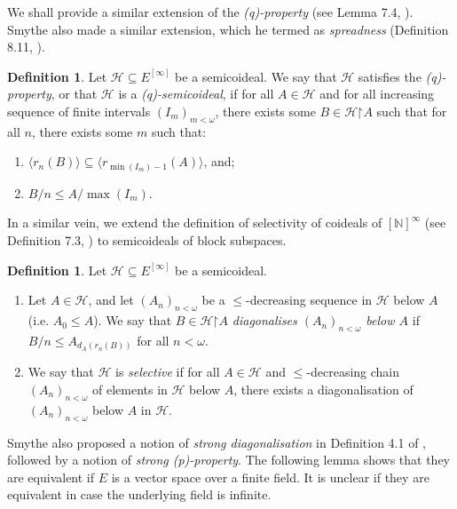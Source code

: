 \documentclass[11pt,reqno]{amsart}
\theoremstyle{plain}
\numberwithin{equation}{section}
\theoremstyle{definition}
\newtheorem{definition}[theorem]{Definition}
\renewcommand{\c}[1]{\langle #1 \rangle}
\newcommand{\N}{\mathbb{N}}
\newcommand{\cal}{\mathcal}
\newcommand{\restrictedto}{\mathord{\upharpoonright}}
\renewcommand{\H}{\cal{H}}
\begin{document}
We shall provide a similar extension of the \emph{(q)-property} (see Lemma 7.4, \cite{T10}). Smythe also made a similar extension, which he termed as \emph{spreadness} (Definition 8.11, \cite{S18}).

\begin{definition}
\label{def:(q)-semicoideal}
    Let $\H \subseteq E^{[\infty]}$ be a semicoideal. We say that $\H$ satisfies the \emph{(q)-property}, or that $\H$ is a \emph{(q)-semicoideal}, if for all $A \in \H$ and for all increasing sequence of finite intervals $(I_m)_{m<\omega}$, there exists some $B \in \H\restrictedto A$ such that for all $n$, there exists some $m$ such that:
    \begin{enumerate}
        \item $\c{r_n(B)} \subseteq \c{r_{\min(I_m)-1}(A)}$, and;

        \item $B/n \leq A/\max(I_m)$.
    \end{enumerate}
\end{definition}

In a similar vein, we extend the definition of selectivity of coideals of $[\N]^\infty$ (see Definition 7.3, \cite{T10}) to semicoideals of block subspaces.

\begin{definition}
\label{def:selective}
    Let $\H \subseteq E^{[\infty]}$ be a semicoideal.
    \begin{enumerate}
        \item Let $A \in \H$, and let $(A_n)_{n<\omega}$ be a $\leq$-decreasing sequence in $\H$ below $A$ (i.e. $A_0 \leq A$). We say that $B \in \H\restrictedto A$ \emph{diagonalises $(A_n)_{n<\omega}$ below $A$} if $B/n \leq A_{d_A(r_n(B))}$ for all $n < \omega$.

        \item We say that $\H$ is \emph{selective} if for all $A \in \H$ and $\leq$-decreasing chain $(A_n)_{n<\omega}$ of elements in $\H$ below $A$, there exists a diagonalisation of $(A_n)_{n<\omega}$ below $A$ in $\H$. 
    \end{enumerate}
\end{definition}

Smythe also proposed a notion of \emph{strong diagonalisation} in Definition 4.1 of \cite{S18}, followed by a notion of \emph{strong (p)-property}. The following lemma shows that they are equivalent if $E$ is a vector space over a finite field. It is unclear if they are equivalent in case the underlying field is infinite.
\end{document}
